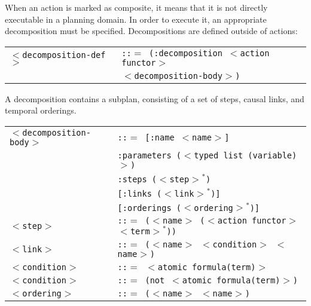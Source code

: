 \documentclass[10pt]{article}
\begin{document}
\begin{flushleft}
When an action is marked as composite, it means that it is not directly executable in a planning domain. In order to execute it, an appropriate decomposition must be specified. Decompositions are defined outside of actions:

\begin{tabbing}
\begin{tabular}{l l}
\texttt{$<$decomposition-def$>$} & \texttt{::$=$ (:decomposition $<$action functor$>$} \\
  & \hspace{7 mm} \texttt{$<$decomposition-body$>$)} \\
  
\end{tabular}
\end{tabbing}


A decomposition contains a subplan, consisting of a set of steps, causal links, and temporal orderings.

\begin{tabbing}
\begin{tabular}{l l}
\texttt{$<$decomposition-body$>$} & \texttt{::$=$ [:name $<$name$>$]} \\
  & \hspace{7 mm} \texttt{:parameters ($<$typed list (variable)$>$)} \\
  & \hspace{7 mm} \texttt{:steps ($<$step$>$$^*$)} \\
  & \hspace{7 mm} \texttt{[:links ($<$link$>$$^*$)]} \\
  & \hspace{7 mm} \texttt{[:orderings ($<$ordering$>$$^*$)]} \\
\texttt{$<$step$>$} & \texttt{::$=$ ($<$name$>$ ($<$action functor$>$ $<$term$>$$^*$))}\\
\texttt{$<$link$>$} & \texttt{::$=$ ($<$name$>$ $<$condition$>$ $<$name$>$)}\\
\texttt{$<$condition$>$} & \texttt{::$=$ $<$atomic formula(term)$>$}\\
\texttt{$<$condition$>$} & \texttt{::$=$ (not $<$atomic formula(term)$>$)}\\
\texttt{$<$ordering$>$} & \texttt{::$=$ ($<$name$>$ $<$name$>$)} \\
\end{tabular}
\end{tabbing}

\end{flushleft}




\end{document}

